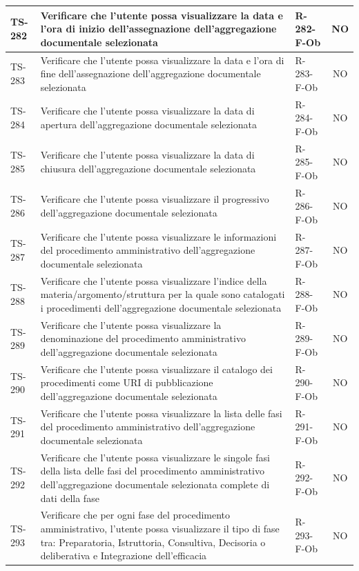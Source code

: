 \documentclass[a4paper,12pt]{article}
\begin{document}
\begin{longtable}{|p{1.5cm}|p{8.3cm}|p{2.4cm}|c|}
\hline
TS-282 & Verificare che l'utente possa visualizzare la data e l'ora di inizio dell'assegnazione dell'aggregazione documentale selezionata & R-282-F-Ob & NO \\
\hline
TS-283 & Verificare che l'utente possa visualizzare la data e l'ora di fine dell'assegnazione dell'aggregazione documentale selezionata & R-283-F-Ob & NO \\
\hline
TS-284 & Verificare che l'utente possa visualizzare la data di apertura dell'aggregazione documentale selezionata & R-284-F-Ob & NO \\
\hline
TS-285 & Verificare che l'utente possa visualizzare la data di chiusura dell'aggregazione documentale selezionata & R-285-F-Ob & NO \\
\hline
TS-286 & Verificare che l'utente possa visualizzare il progressivo dell'aggregazione documentale selezionata & R-286-F-Ob & NO \\
\hline
TS-287 & Verificare che l'utente possa visualizzare le informazioni del procedimento amministrativo dell'aggregazione documentale selezionata & R-287-F-Ob & NO \\
\hline
TS-288 & Verificare che l'utente possa visualizzare l'indice della materia/argomento/struttura per la quale sono catalogati i procedimenti dell'aggregazione documentale selezionata & R-288-F-Ob & NO \\
\hline
TS-289 & Verificare che l'utente possa visualizzare la denominazione del procedimento amministrativo dell'aggregazione documentale selezionata & R-289-F-Ob & NO \\
\hline
TS-290 & Verificare che l'utente possa visualizzare il catalogo dei procedimenti come URI di pubblicazione dell'aggregazione documentale selezionata & R-290-F-Ob & NO \\
\hline
TS-291 & Verificare che l'utente possa visualizzare la lista delle fasi del procedimento amministrativo dell'aggregazione documentale selezionata & R-291-F-Ob & NO \\
\hline
TS-292 & Verificare che l'utente possa visualizzare le singole fasi della lista delle fasi del procedimento amministrativo dell'aggregazione documentale selezionata complete di dati della fase & R-292-F-Ob & NO \\
\hline
TS-293 & Verificare che per ogni fase del procedimento amministrativo, l'utente possa visualizzare il tipo di fase tra: Preparatoria, Istruttoria, Consultiva, Decisoria o deliberativa e Integrazione dell'efficacia & R-293-F-Ob & NO \\
\hline

\end{longtable}
\end{document}
